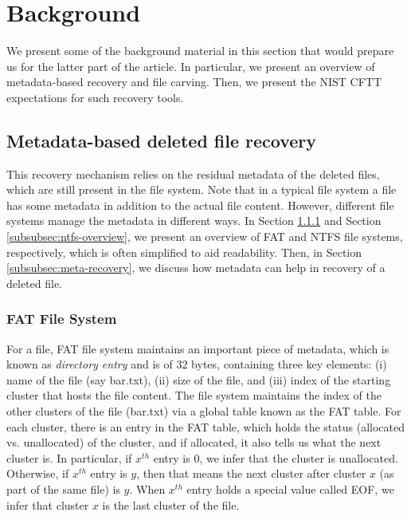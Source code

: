 \section{Background}

We present some of the background material in this section that would prepare
us for the latter part of the article. 
In particular, we present an overview of metadata-based recovery and file carving. 
Then, we present the NIST CFTT expectations for such recovery tools.  


\subsection{Metadata-based deleted file recovery}
This recovery mechanism relies on the residual metadata of the deleted files, 
which are still present in the file system. Note that in a typical file system 
a file has some metadata in addition to the actual file content. However,
different file systems
manage the metadata in different ways.
In Section \ref{subsubsec:fat-overview} and Section \ref{subsubsec:ntfs-overview}, 
we present an overview of FAT and NTFS file systems, respectively, which is often
simplified to aid readability. 
Then, in Section \ref{subsubsec:meta-recovery}, we discuss how metadata can help in 
recovery of a deleted file.

\subsubsection{FAT File System} \label{subsubsec:fat-overview}

For a file, FAT file system maintains an important piece of metadata, 
which is known as \emph{directory entry} and is of 32 bytes, containing three 
key elements: (i) name of the file (say bar.txt), (ii) size of the file, and 
(iii) index of the starting cluster that hosts the file content. 
The file system maintains the index of the other clusters of the file (bar.txt) 
via a global table known as the FAT table. For each cluster, 
there is an entry in the FAT table, which holds the status 
(allocated vs. unallocated) of the cluster, and if allocated, 
it also tells us what the next cluster is. In particular, if $x^{th}$ entry is $0$, 
we infer that the cluster is unallocated. Otherwise, if $x^{th}$ entry is $y$, then 
that means the next cluster after cluster $x$ (as part of the same file) is $y$.
When $x^{th}$ entry holds a special value called EOF, we infer that cluster $x$ is
the last cluster of the file.

